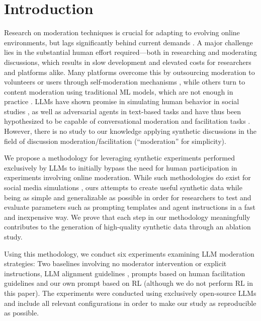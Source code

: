 %

\section{Introduction}
\label{sec:introduction}

Research on moderation techniques is crucial for adapting to evolving online environments, but lags significantly behind current demands \cite{seering_self_moderation, make_reddit_great}. A major challenge lies in the substantial human effort required—both in researching and moderating discussions, which results in slow development and elevated costs for researchers and platforms alike. Many platforms overcome this by outsourcing moderation to volunteers or users through self-moderation mechanisms \cite{Matias2019TheCL, schaffner_community_guidelines}, while others turn to content moderation using traditional \ac{ML} models, which are not enough in practice \cite{horta_automated_moderation, schaffner_community_guidelines}. \acfp{LLM} have shown promise in simulating human behavior in social studies \cite{park2024generativeagentsimulations1000, hewitt2024predicting, Park2023GenerativeAI}, as well as adversarial agents in text-based tasks \cite{cheng-self-play} and have thus been hypothesized to be capable of conversational moderation and facilitation tasks \cite{small-polis-llm, korre2025evaluation}. However, there is no study to our knowledge applying synthetic discussions in the field of discussion moderation/facilitation (“moderation” for simplicity).

We propose a methodology for leveraging synthetic experiments performed exclusively by \acp{LLM} to initially bypass the need for human participation in experiments involving online moderation. While such methodologies do exist for social media simulations \cite{park_simulacra, mou_2024, tornberg_2023, y_social, balog_2024}, ours attempts to create useful synthetic data while being as simple and generalizable as possible in order for researchers to test and evaluate parameters such as prompting templates and agent instructions in a fast and inexpensive way. We prove that each step in our methodology meaningfully contributes to the generation of high-quality synthetic data through an ablation study. 

Using this methodology, we conduct six experiments examining \ac{LLM} moderation strategies: Two baselines involving no moderator intervention or explicit instructions, \ac{LLM} alignment guidelines \cite{collective_constitution}, prompts based on human facilitation guidelines \cite{Cornell_eRulemaking2017, dimitra-book} and our own prompt based on \ac{RL} (although we do not perform \ac{RL} in this paper). The experiments were conducted using exclusively open-source \acp{LLM} and include all relevant configurations in order to make our study as reproducible as possible. 

